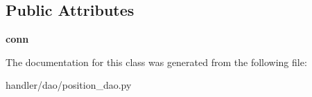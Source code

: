 \subsection*{Public Attributes}
\begin{DoxyCompactItemize}
\item 
\mbox{\label{classhandler_1_1dao_1_1position__dao_1_1_position_d_a_o_a5f74f265c45129d7f074ff55fcaa6170}} 
{\bfseries conn}
\end{DoxyCompactItemize}


The documentation for this class was generated from the following file\+:\begin{DoxyCompactItemize}
\item 
handler/dao/position\+\_\+dao.\+py\end{DoxyCompactItemize}
